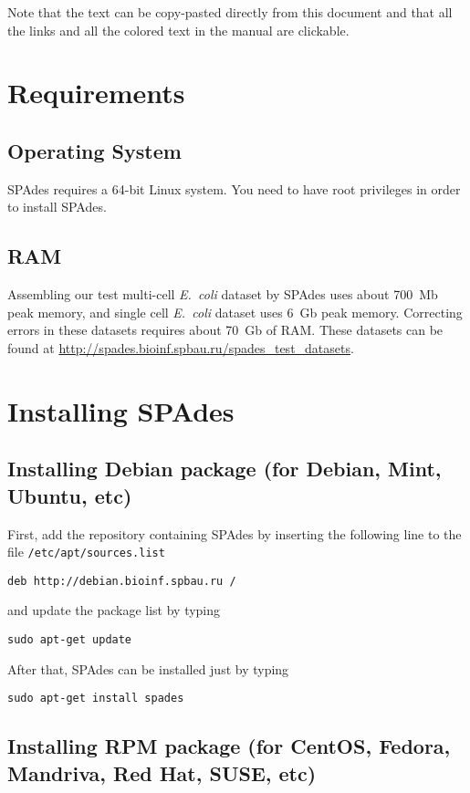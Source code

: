 \documentclass{article}
\def\spades{SPAdes}
\def\ecoli{\it E.~coli}
\begin{document}
Note that the text can be copy-pasted directly from this document
and that all the links and all the colored text in the manual are clickable.


\section{Requirements}
\subsection{Operating System}
{\spades} requires a 64-bit Linux system.
You need to have root privileges in order to install {\spades}.

\subsection{RAM}
Assembling our test multi-cell {\ecoli} dataset 
by {\spades} uses about 700~Mb peak memory, and single cell
{\ecoli} dataset uses 6~Gb peak memory. 
Correcting errors in these datasets requires about 70~Gb of RAM.
These datasets can be found at \url{http://spades.bioinf.spbau.ru/spades_test_datasets}.

\section{Installing {\spades}}
\subsection{Installing Debian package (for Debian, Mint, Ubuntu, etc)}
First, add the repository containing {\spades} by inserting the following line
to the file {\tt /etc/apt/sources.list}
\begin{lstlisting}
deb http://debian.bioinf.spbau.ru /
\end{lstlisting}
and update the package list by typing
\begin{lstlisting}
sudo apt-get update
\end{lstlisting}
After that, {\spades} can be installed just by typing
\begin{lstlisting}
sudo apt-get install spades
\end{lstlisting}

\subsection{Installing RPM package (for CentOS, Fedora, Mandriva, Red Hat, SUSE, etc)}
\end{document}

